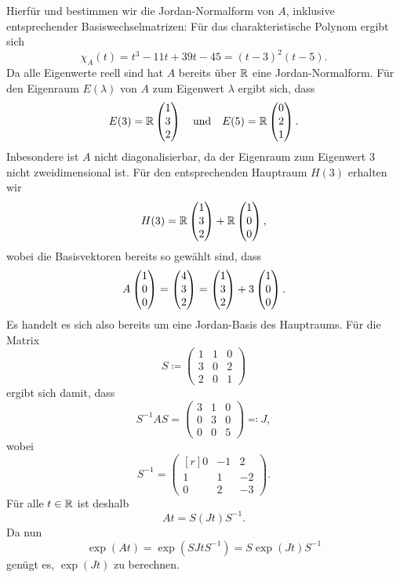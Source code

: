 \documentclass[a4paper, 10pt]{article}
\begin{document}
Hierfür und bestimmen wir die Jordan-Normalform von $A$, inklusive entsprechender Basiswechselmatrizen:
Für das charakteristische Polynom ergibt sich
\[
    \chi_A(t)
  = t^3 - 11t + 39t - 45
  = (t-3)^2 (t-5).
\]
Da alle Eigenwerte reell sind hat $A$ bereits über $\mathbb{R}$ eine Jordan-Normalform.
Für den Eigenraum $E(\lambda)$ von $A$ zum Eigenwert $\lambda$ ergibt sich, dass
\[
  E(3) = \mathbb{R} \begin{pmatrix} 1 \\ 3 \\ 2 \end{pmatrix}
  \quad\text{und}\quad
  E(5) = \mathbb{R} \begin{pmatrix} 0 \\ 2 \\ 1 \end{pmatrix}.
\]
Inbesondere ist $A$ nicht diagonalisierbar, da der Eigenraum zum Eigenwert $3$ nicht zweidimensional ist.
Für den entsprechenden Hauptraum $H(3)$ erhalten wir
\[
    H(3)
  = \mathbb{R} \begin{pmatrix} 1 \\ 3 \\ 2 \end{pmatrix} + \mathbb{R} \begin{pmatrix} 1 \\ 0 \\ 0 \end{pmatrix},
\]
wobei die Basisvektoren bereits so gewählt sind, dass
\[
    A \begin{pmatrix} 1 \\ 0 \\ 0 \end{pmatrix}
  = \begin{pmatrix} 4 \\ 3 \\ 2 \end{pmatrix}
  = \begin{pmatrix} 1 \\ 3 \\ 2 \end{pmatrix}+ 3 \begin{pmatrix} 1 \\ 0 \\ 0 \end{pmatrix}.
\]
Es handelt es sich also bereits um eine Jordan-Basis des Hauptraums.
Für die Matrix
\[
  S
  \coloneqq
  \begin{pmatrix}
    1 & 1 & 0 \\
    3 & 0 & 2 \\
    2 & 0 & 1
  \end{pmatrix}
\]
ergibt sich damit, dass
\[
  S^{-1} A S
  =
  \begin{pmatrix}
    3 & 1 & 0 \\
    0 & 3 & 0 \\
    0 & 0 & 5
  \end{pmatrix}
  \eqqcolon J,
\]
wobei
\[
  S^{-1}
  =
  \begin{pmatrix*}[r]
    0 & -1  &  2  \\
    1 &  1  & -2  \\
    0 &  2  & -3
  \end{pmatrix*}.
\]
Für alle $t \in \mathbb{R}$ ist deshalb
\[
  At = S (Jt) S^{-1}.
\]
Da nun
\[
    \exp(At)
  = \exp(S Jt S^{-1})
  = S \exp(Jt) S^{-1}
\]
genügt es, $\exp(Jt)$ zu berechnen.
\end{document}
